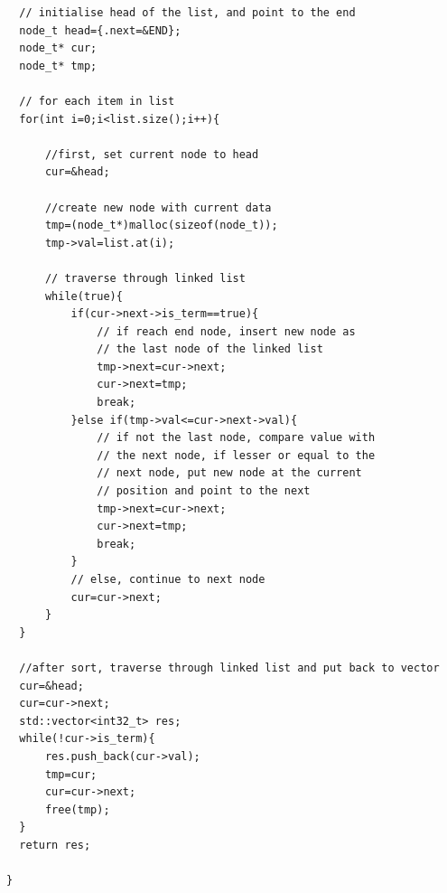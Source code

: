 \documentclass[12pt,a4paper]{report}
\begin{document}
\begin{lstlisting}
  // initialise head of the list, and point to the end
  node_t head={.next=&END};
  node_t* cur;
  node_t* tmp;

  // for each item in list
  for(int i=0;i<list.size();i++){

      //first, set current node to head
      cur=&head;

      //create new node with current data
      tmp=(node_t*)malloc(sizeof(node_t));
      tmp->val=list.at(i);

      // traverse through linked list
      while(true){
          if(cur->next->is_term==true){
              // if reach end node, insert new node as
              // the last node of the linked list
              tmp->next=cur->next;
              cur->next=tmp;
              break;
          }else if(tmp->val<=cur->next->val){
              // if not the last node, compare value with
              // the next node, if lesser or equal to the 
              // next node, put new node at the current 
              // position and point to the next
              tmp->next=cur->next;
              cur->next=tmp;
              break;
          }
          // else, continue to next node
          cur=cur->next;
      }
  }

  //after sort, traverse through linked list and put back to vector
  cur=&head;
  cur=cur->next;
  std::vector<int32_t> res;
  while(!cur->is_term){
      res.push_back(cur->val);
      tmp=cur;
      cur=cur->next;
      free(tmp);
  }
  return res;
  
}

\end{lstlisting}
\end{document}
